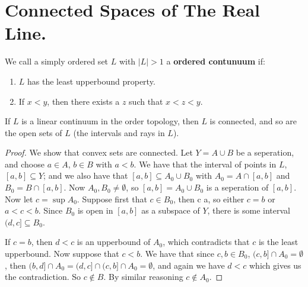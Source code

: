 
\section{Connected Spaces of The Real Line.}

\begin{definition}
    We call a simply ordered set $L$ with  $|L|>1$ a  \textbf{ordered contunuum} if:
        \begin{enumerate}[label=(\arabic*)]
            \item $L$ has the least upperbound property.

            \item If $x<y$, then there exists a  $z$ such that  $x<z<y$.
        \end{enumerate}
\end{definition}

\begin{theorem}\label{3.2.1}
    If $L$ is a linear continuum in the order topology, then  $L$ is connected, and so are the open
    sets of  $L$  (the intervals and rays in $L$).
\end{theorem}
\begin{proof}
    We show that convex sets are connected. Let $Y=A \cup B$ be a seperation, and choose  $a \in A$,
     $b \in B$ with  $a<b$. We have that the interval of points in  $L$,  $[a,b] \subseteq Y$; and
     we also have that $[a,b] \subseteq A_0 \cup B_0$ with $ A_0=A \cap [a,b]$ and $ B_0=B \cap
     [a,b]$. Now $ A_0,B_0 \neq \emptyset$, so $[a,b]=A_0 \cup B_0$ is a seperation of $[a,b]$. Now
     let $c=\sup{A_0}$. Suppose first that $c \in B_0$, then c \neq a, so either $c=b$ or  $a<c<b$.
     Since  $ B_0$ is open in $[a,b]$ as a subspace of $Y$, there is some interval  $(d,c] \subseteq
     B_0$.

     If $c=b$, then  $d<c$ is an upperbound of  $ A_0$, which contradicts that $c$ is the least
     upperbound. Now suppose that $c<b$. We have that since  $c,b \in B_0$, $(c,b] \cap A_0=
     \emptyset$, then $(b,d] \cap A_0=(d,c] \cap (c,b] \cap A_0 = \emptyset$, and again we have
     $d<c$ which gives us the contradiction. So  $c \notin B$. By similar reasoning  $c \notin A_0$.
\end{proof}
